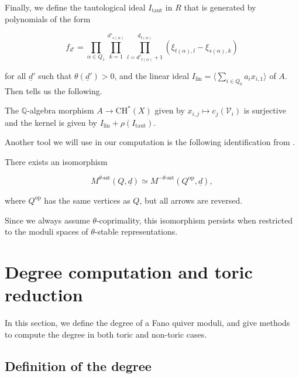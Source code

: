 \documentclass[11pt]{article}
\begin{document}
Finally, we define the tautological ideal \(I_{\text{taut}}\) in \(R\) that is generated by polynomials of the form 

\[
f_{d'} = \prod_{\alpha\in Q_1}\prod_{k = 1}^{d'_{s(\alpha)}}\prod_{l = d'_{t(\alpha)} + 1}^{d_{t(\alpha)}}(\xi_{t(\alpha), l} - \xi_{s(\alpha), k})
\]

for all \(\underline{d}'\) such that \(\theta(\underline{d}') > 0\), and the linear ideal \(I_{\text{lin}} = \langle \sum_{i\in Q_0}a_i x_{i, 1}\rangle\) of \(A\). Then \cite[Proposition 14]{franzen2015chow} tells us the following. 

\begin{theorem}\label{Theorem:chow-quiver-pre}
    The \(\mathbb{Q}\)-algebra morphism \(A\rightarrow \mathrm{CH}^*(X)\) given by \(x_{i,j}\mapsto c_j(\mathcal{V}_i)\) is surjective and the kernel is given by \(I_{\text{lin}} + \rho(I_{\text{taut}})\).

\end{theorem}

Another tool we will use in our computation is the following identification from \cite[Lemma 2.2]{ReiKronecker}.

\begin{lemma}\label{Lemma:quiver-op-iso}
    There exists an isomorphism 

    \[
    M^{\theta\text{-sst}}(Q, \underline{d})\simeq M^{-\theta\text{-sst}}(Q^{\text{op}}, \underline{d}),
    \]

    where \(Q^{\text{op}}\) has the same vertices as \(Q\), but all arrows are reversed. 
\end{lemma}

\begin{remark}
    Since we always assume \(\theta\)-coprimality, this isomorphism persists when restricted to the moduli spaces of \(\theta\)-stable representations. 
\end{remark}

\section{Degree computation and toric reduction}\label{Section:3}

In this section, we define the degree of a Fano quiver moduli, and give methods to compute the degree in both toric and non-toric cases. 

\subsection{Definition of the degree}
\end{document}
